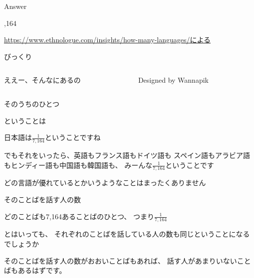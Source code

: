 \documentclass[
  ignorenonframetext,
  aspectratio=169,
  xcolor=dvipsnames]{beamer}
\begin{document}
\begin{frame}{Answer}
\label{answer}
\Huge
\vfill

,164

\vfill

\raggedleft
\scriptsize

\url{https://www.ethnologue.com/insights/how-many-languages/による}
\end{frame}

\begin{frame}{びっくり}
\label{ux3073ux3063ux304fux308a}
\Large

\begin{columns}
    \begin{column}{0.475\textwidth}
      ええー、そんなにあるの
    \end{column}
    \begin{column}{0.475\textwidth}
            {\tiny Designed by Wannapik}
      \end{column}
  \end{columns}
\end{frame}

\begin{frame}{そのうちのひとつ}
\label{ux305dux306eux3046ux3061ux306eux3072ux3068ux3064}
\Large

ということは\pause

日本語は\Huge \phantom{0}\(\frac{1}{7,164}\)\phantom{0}\Large ということですね

\vfill
\pause

でもそれをいったら、\pause 英語もフランス語もドイツ語も\pause
スペイン語もアラビア語もヒンディー語も\pause 中国語も韓国語も、\pause
みーんな\Huge\phantom{0}\(\frac{1}{7,164}\)\phantom{0}\Large ということです

\vfill
\pause

どの言語が優れているとかいうようなことはまったくありません
\end{frame}

\begin{frame}{そのことばを話す人の数}
\label{ux305dux306eux3053ux3068ux3070ux3092ux8a71ux3059ux4ebaux306eux6570}
\Large

どのことばも7,164あることばのひとつ、\pause
つまり\Huge\phantom{0}\(\frac{1}{7,164}\)\phantom{0}

\Large
\pause

とはいっても、
それぞれのことばを話している人の数も同じということになるでしょうか

\pause

そのことばを話す人の数がおおいことばもあれば、
話す人があまりいないことばもあるはずです。
\end{frame}
\end{document}
